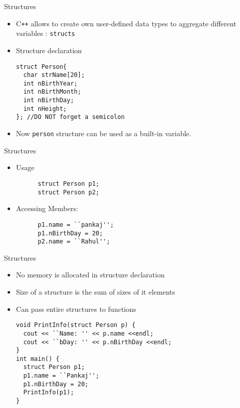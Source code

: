 \documentclass{beamer}
\begin{document}
\begin{frame}[fragile]{Structures}
  \begin{itemize}
    \item C\texttt{++} allows to create own user-defined data types to aggregate different variables : \texttt{structs}\pause
    \item Structure declaration
      \begin{lstlisting}
struct Person{
  char strName[20];
  int nBirthYear;
  int nBirthMonth;
  int nBirthDay;
  int nHeight;  
}; //DO NOT forget a semicolon
      \end{lstlisting}\pause
    \item Now \texttt{person} structure can be used as a built-in variable.
  \end{itemize}
\end{frame}

\begin{frame}[fragile]{Structures}
  \begin{itemize}
  \item Usage
    \begin{lstlisting}
      struct Person p1;
      struct Person p2;
    \end{lstlisting}\pause
  \item Accessing Members:
    \begin{lstlisting}
      p1.name = ``pankaj'';
      p1.nBirthDay = 20;
      p2.name = ``Rahul'';
    \end{lstlisting}
  \end{itemize}
\end{frame}

\begin{frame}[fragile]{Structures}
  \begin{itemize}
  \item No memory is allocated in structure declaration\pause
  \item Size of a structure is the sum of sizes of it elements\pause
  \item Can pass entire structures to functions
    \begin{lstlisting}
void PrintInfo(struct Person p) {
  cout << ``Name: '' << p.name <<endl;
  cout << ``bDay: '' << p.nBirthDay <<endl;
}
int main() {
  struct Person p1;
  p1.name = ``Pankaj'';
  p1.nBirthDay = 20;
  PrintInfo(p1);
}
    \end{lstlisting}
  \end{itemize}
\end{frame}
\end{document}
